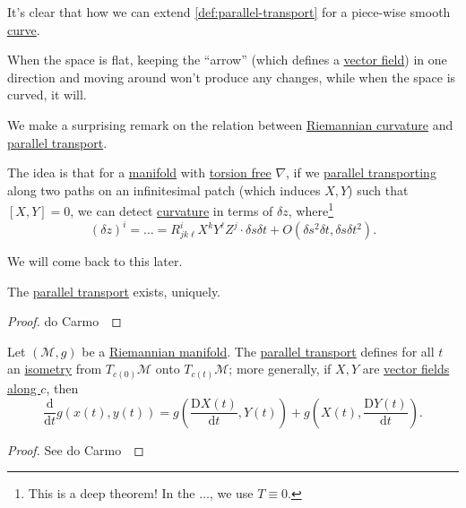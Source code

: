 It's clear that how we can extend \autoref{def:parallel-transport} for a piece-wise smooth \hyperref[def:curve]{curve}.

\begin{intuition}
	When the space is flat, keeping the ``arrow'' (which defines a \hyperref[def:vector-field]{vector field}) in one direction and moving around won't produce any changes, while when the space is curved, it will.
	\begin{center}
	\end{center}
\end{intuition}

We make a surprising remark on the relation between \hyperref[def:Riemannian-curvature]{Riemannian curvature} and \hyperref[def:parallel-transport]{parallel transport}.

\begin{remark}
	The idea is that for a \hyperref[def:smooth-manifold]{manifold} with \hyperref[def:torsion-free]{torsion free} \(\nabla \), if we \hyperref[def:parallel-transport]{parallel transporting} along two paths on an infinitesimal patch (which induces \(X, Y\)) such that \([X, Y]=0\), we can detect \hyperref[def:Riemannian-curvature]{curvature} in terms of \(\delta z\), where\footnote{This is a deep theorem! In the \(\dots \), we use \(T \equiv 0\).}
	\[
		(\delta z)^i = \dots = R^i_{jk \ell } X^k Y^{\ell} Z^j\cdot \delta s \delta t + O(\delta s^2 \delta t, \delta s \delta t^2).
	\]
	\begin{center}
	\end{center}
	We will come back to this later.
\end{remark}

\begin{proposition}
	The \hyperref[def:parallel-transport]{parallel transport} exists, uniquely.
\end{proposition}
\begin{proof}
	do Carmo~\cite[Proposition 2.6]{flaherty2013riemannian}
\end{proof}

\begin{proposition}
	Let \((\mathcal{M} , g)\) be a \hyperref[def:Riemannian-manifold]{Riemannian manifold}. The \hyperref[def:parallel-transport]{parallel transport} defines for all \(t\) an \hyperref[def:isometry]{isometry} from \(T_{c(0)} \mathcal{M} \) onto \(T_{c(t)} \mathcal{M} \); more generally, if \(X, Y\) are \hyperref[def:vector-field-along-curve]{vector fields along \(c\)}, then
	\[
		\frac{\mathrm{d}}{\mathrm{d}t} g(x(t), y(t))
		= g\left( \frac{\mathrm{D} X(t)}{\mathrm{d} t}, Y(t)\right) + g\left(X(t), \frac{\mathrm{D} Y(t)}{\mathrm{d} t} \right) .
	\]
\end{proposition}
\begin{proof}
	See do Carmo~\cite[Proposition 3.2]{flaherty2013riemannian}
\end{proof}

